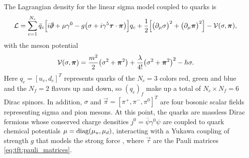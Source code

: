 
The Lagrangian density for the linear sigma model coupled to quarks is
\begin{equation}
	\mathcal{L} = \sum_{c=1}^{N_c} \bar{q}_c \Big[ i \slashed\partial + \mu \gamma^0 - g \big( \sigma + i \gamma^5 {\bm{\tau}} \cdot {\bm{\pi}} \big) \Big] q_c
	      + \frac12 \Big[ \big( \partial_\mu \sigma \big)^2 + \big( \partial_\mu {\bm{\pi}} \big)^2 \Big] - \mathcal{V}(\sigma,{\bm{\pi}}) ,
\label{eq:lsm:lagrangian}
\end{equation}
with the meson potential
\begin{equation}
	\mathcal{V}(\sigma, {\bm{\pi}}) = \frac{m^2}{2} \big( \sigma^2 + {\bm{\pi}}^2 \big) + \frac{\lambda}{4!} \big( \sigma^2 + {\bm{\pi}}^2 \big)^2 - h \sigma .
\label{eq:lsm:potential}
\end{equation}
Here $q_c = [u_c, d_c]^T$ represents quarks of the $N_c = 3$ colors red, green and blue and the $N_f = 2$ flavors up and down, so $(q_c)_f$ make up a total of $N_c \times N_f = 6$ Dirac spinors.
In addition, $\sigma$ and $\vec\pi = [\pi^+, \pi^-, \pi^0]^T$ are four bosonic scalar fields representing sigma and pion mesons.
At this point, the quarks are massless Dirac fermions whose conserved charge densities $j^0 = \bar\psi \gamma^0 \psi$ are coupled to quark chemical potentials $\mu = \operatorname{diag}(\mu_u, \mu_d)$, interacting with a Yukawa coupling of strength $g$ that models the strong force , where $\vec\tau$ are the Pauli matrices \eqref{eq:tft:pauli_matrices}.

